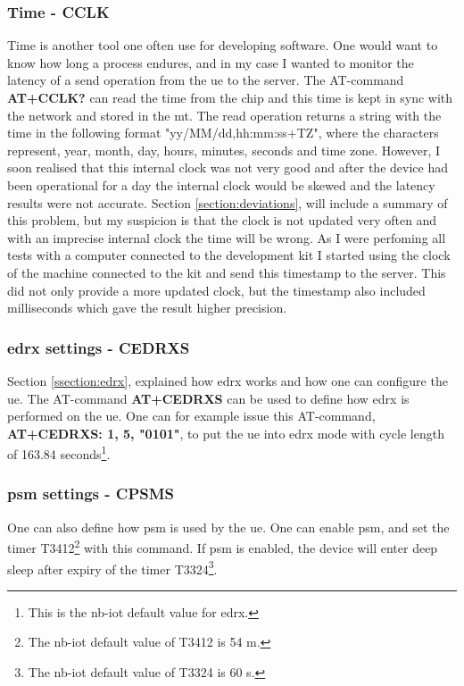 \documentclass[USenglish]{ifimaster}  %
\begin{document}
\subsubsection{Time - CCLK} \label{ssection:timecclk}
Time is another tool one often use for developing software. One would want to know how long a process endures, and in my case I wanted to monitor the latency of a send operation from the \acrshort{ue} to the server. The AT-command \textbf{AT+CCLK?} can read the time from the chip and this time is kept in sync with the network and stored in the \acrfull{mt}. The read operation returns a string with the time in the following format "yy/MM/dd,hh:mm:ss+TZ", where the characters represent, year, month, day, hours, minutes, seconds and time zone. However, I soon realised that this internal clock was not very good and after the device had been operational for a day the internal clock would be skewed and the latency results were not accurate. Section \vref{section:deviations}, will include a summary of this problem, but my suspicion is that the clock is not updated very often and with an imprecise internal clock the time will be wrong. As I were perfoming all tests with a computer connected to the development kit I started using the clock of the machine connected to the kit and send this timestamp to the server. This did not only provide a more updated clock, but the timestamp also included milliseconds which gave the result higher precision.

\subsubsection{\acrshort{edrx} settings - CEDRXS}
Section \vref{ssection:edrx}, explained how \acrshort{edrx} works and how one can configure the \acrshort{ue}. The AT-command \textbf{AT+CEDRXS} can be used to define how \acrshort{edrx} is performed on the \acrshort{ue}. One can for example issue this AT-command, \textbf{AT+CEDRXS: 1, 5, "0101"}, to put the \acrshort{ue} into \acrshort{edrx} mode with cycle length of 163.84 seconds\footnote{This is the \acrshort{nb-iot} default value for \acrshort{edrx}.}.

\subsubsection{\acrshort{psm} settings - CPSMS}
One can also define how \acrshort{psm} is used by the \acrshort{ue}. One can enable \acrshort{psm}, and set the timer \acrfull{T3412}\footnote{The \acrshort{nb-iot} default value of \acrshort{T3412} is 54 m.\cite{atcommand:ubloxchip}} with this command. If \acrshort{psm} is enabled, the device will enter deep sleep after expiry of the timer \acrfull{T3324}\footnote{The \acrshort{nb-iot} default value of \acrshort{T3324} is 60 s.}.
\end{document}

